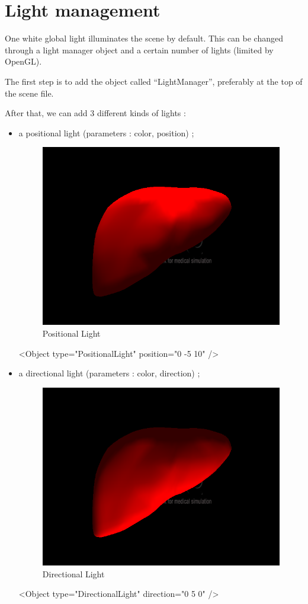 

\section{Light management}

One white global light illuminates the scene by default. This can be changed
through a light manager object and a certain number of lights (limited by
OpenGL).

The first step is to add the object called ``LightManager'', preferably at the
top of the scene file.
\begin{code_xml}
	<Object type=``LightManager'' />}
\end{code_xml}

After that, we can add 3 different kinds of lights :
\begin{itemize}
  \item a positional light (parameters : color, position) ;
	\begin{figure}[!h]
	\centering
	\includegraphics[width=0.33\linewidth]{images/light_pos.png}
	\caption{Positional Light}
	\end{figure}

	\begin{code_xml}
		<Object type="PositionalLight" position="0 -5 10" />
	\end{code_xml}
\newpage
  \item a directional light (parameters : color, direction) ; 
	\begin{figure}[!h]
	\centering
	\includegraphics[width=0.33\linewidth]{images/light_dir.png}
	\caption{Directional Light}
	\end{figure}

	\begin{code_xml}
		<Object type="DirectionalLight" direction="0 5 0" />
	\end{code_xml}



\end{itemize}
